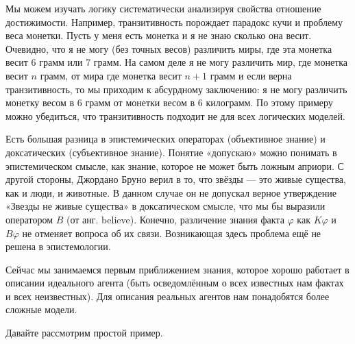 \documentclass[openany]{book}
\theoremstyle{plain}
\theoremstyle{definition}
\begin{document}
Мы можем изучать логику систематически анализируя свойства отношение достижимости. Например, транзитивность порождает парадокс кучи и проблему веса монетки. Пусть у меня есть монетка и я не знаю сколько она весит. Очевидно, что я не могу (без точных весов) различить миры, где эта монетка весит 6 грамм или 7 грамм. На самом деле я не могу различить мир, где монетка весит \(n\) грамм, от мира где монетка весит \(n+1\) грамм и если верна транзитивность, то мы приходим к абсурдному заключению: я не могу различить монетку весом в 6 грамм от монетки весом в 6 килограмм. По этому примеру можно убедиться, что транзитивность подходит не для всех логических моделей.

Есть большая разница в эпистемических операторах (объективное знание) и доксатических (субъективное знание). Понятие «допускаю» можно понимать в эпистемическом смысле, как знание, которое не может быть ложным априори. С другой стороны, Джордано Бруно верил в то, что звёзды — это живые существа, как и люди, и животные. В данном случае он не допускал верное утверждение «Звезды не живые существа» в доксатическом смысле, что мы бы выразили оператором \(B\) (от анг. believe). Конечно, различение знания факта \(\varphi\) как \(K\varphi\) и \(B\varphi\) не отменяет вопроса об их связи. Возникающая здесь проблема ещё не решена в эпистемологии.

Сейчас мы занимаемся первым приближением знания, которое хорошо работает в описании идеального агента (быть осведомлённым о всех известных нам фактах и всех неизвестных). Для описания реальных агентов нам понадобятся более сложные модели.



Давайте рассмотрим простой пример.

\end{document}
